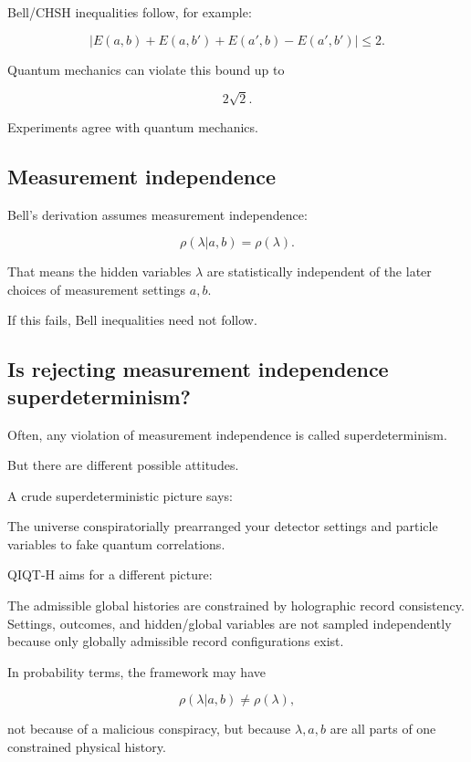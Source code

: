 \documentclass[11pt,a4paper]{article}
\newenvironment{qiqtquote}{\begin{mdframed}[style=quotestyle]}{\end{mdframed}}
\begin{document}
Bell/CHSH inequalities follow, for example:

\[
|E(a,b)+E(a,b')+E(a',b)-E(a',b')|\leq 2.
\]

Quantum mechanics can violate this bound up to

\[
2\sqrt{2}.
\]

Experiments agree with quantum mechanics.

\subsection{Measurement independence}

Bell’s derivation assumes measurement independence:

\[
\rho(\lambda|a,b)=\rho(\lambda).
\]

That means the hidden variables $\lambda$ are statistically independent of the later choices of measurement settings $a,b$.

If this fails, Bell inequalities need not follow.

\subsection{Is rejecting measurement independence superdeterminism?}

Often, any violation of measurement independence is called superdeterminism.

But there are different possible attitudes.

A crude superdeterministic picture says:

\begin{qiqtquote}
The universe conspiratorially prearranged your detector settings and particle variables to fake quantum correlations.
\end{qiqtquote}

QIQT-H aims for a different picture:

\begin{qiqtquote}
The admissible global histories are constrained by holographic record consistency. Settings, outcomes, and hidden/global variables are not sampled independently because only globally admissible record configurations exist.
\end{qiqtquote}

In probability terms, the framework may have

\[
\rho(\lambda|a,b)\neq \rho(\lambda),
\]

not because of a malicious conspiracy, but because $\lambda,a,b$ are all parts of one constrained physical history.
\end{document}
